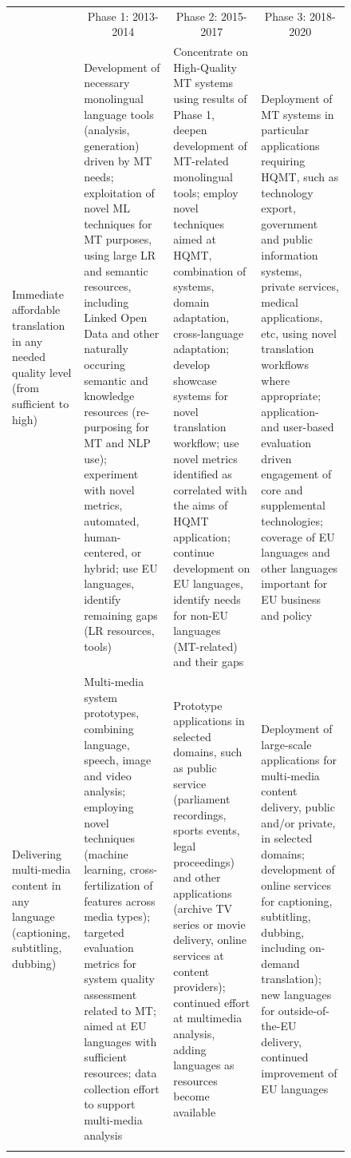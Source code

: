 \documentclass[10pt, plain]{../../metanetpaper}
\begin{document}
\begin{multicols}{2}
\begin{figure}[htbp]
  \centering
  \small
  \begin{tabular}{@{}p{2.5cm}p{4cm}p{4cm}p{4cm}@{}} \toprule\addlinespace
    \multicolumn{1}{c}{Research Priority} & \multicolumn{1}{c}{Phase 1: 2013-2014} & \multicolumn{1}{c}{Phase 2: 2015-2017} & \multicolumn{1}{c}{Phase 3: 2018-2020} \\ \addlinespace\midrule\addlinespace
    Immediate affordable translation in any needed quality level (from sufficient to high) & Development of necessary monolingual language tools (analysis, generation) driven by MT needs; exploitation of novel ML techniques for MT purposes, using large LR and semantic resources, including Linked Open Data and other naturally occuring semantic and knowledge  resources (re-purposing for MT and NLP use); experiment with novel metrics, automated, human-centered, or hybrid; use EU languages, identify remaining gaps (LR resources, tools) & Concentrate on High-Quality MT systems using results of Phase 1, deepen development of MT-related monolingual tools; employ novel techniques aimed at HQMT, combination of systems, domain adaptation, cross-language adaptation; develop showcase systems for novel translation workflow; use novel metrics identified as correlated with the aims of HQMT application; continue development on EU languages, identify needs for non-EU languages (MT-related) and their gaps & Deployment of MT systems in particular applications requiring HQMT, such as technology export, government and public information systems, private services, medical applications, etc, using novel translation workflows where appropriate; application- and user-based evaluation driven engagement of core and supplemental technologies; coverage of EU languages and other languages important for EU business and policy \\ \addlinespace
    Delivering multi-media content in any language (captioning, subtitling, dubbing) & Multi-media system prototypes, combining language, speech, image and video analysis; employing novel techniques (machine learning, cross-fertilization of features across media types); targeted evaluation metrics for system quality assessment related to MT; aimed at EU languages with sufficient resources; data collection effort to support multi-media analysis & Prototype applications in selected domains, such as public service (parliament recordings, sports events, legal proceedings) and other applications (archive TV series or movie delivery, online services at content providers); continued effort at multimedia analysis, adding languages as resources become available & Deployment of large-scale applications for multi-media content delivery, public and/or private, in selected domains; development of online services for captioning, subtitling, dubbing, including on-demand translation); new languages for outside-of-the-EU delivery, continued improvement of EU languages \\ \addlinespace

\end{tabular}
\end{figure}
\end{multicols}
\end{document}
